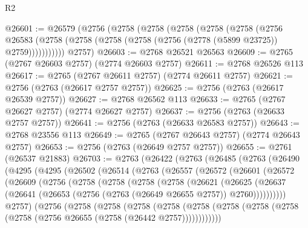\begin{lexlean}{R2}
\begin{coremodule}
@26601 := @26579
    (@2756
      (@2758
        (@2758
          (@2758
            (@2758
              (@2758
                (@2756
                  @26583
                  (@2758 (@2758 (@2758 (@2758 (@2756 (@2778 (@5899 @23725)) @2759)))))))))))
      @2757)
@26603 := @2768 @26521 @26563
@26609 := @2765 (@2767 @26603 @2757) (@2774 @26603 @2757)
@26611 := @2768 @26526 @113
@26617 := @2765 (@2767 @26611 @2757) (@2774 @26611 @2757)
@26621 := @2756 (@2763 (@26617 @2757 @2757))
@26625 := @2756 (@2763 (@26617 @26539 @2757))
@26627 := @2768 @26562 @113
@26633 := @2765 (@2767 @26627 @2757) (@2774 @26627 @2757)
@26637 := @2756 (@2763 (@26633 @2757 @2757))
@26641 := @2756 (@2763 (@26633 @26583 @2757))
@26643 := @2768 @23556 @113
@26649 := @2765 (@2767 @26643 @2757) (@2774 @26643 @2757)
@26653 := @2756 (@2763 (@26649 @2757 @2757))
@26655 := @2761 (@26537 @21883)
@26703 := @2763
    (@26422
      (@2763
        (@26485
          (@2763
            (@26490
              (@4295
                (@4295
                  (@26502
                    (@26514
                      (@2763
                        (@26557
                          (@26572
                            (@26601
                              (@26572
                                (@26609
                                  (@2756
                                    (@2758
                                      (@2758
                                        (@2758
                                          (@2758
                                            (@26621
                                              (@26625
                                                (@26637
                                                  (@26641
                                                    (@26653
                                                      (@2756
                                                        (@2763 (@26649 @26655 @2757))
                                                        @2760))))))))))
                                    @2757)
                                  (@2756
                                    (@2758
                                      (@2758
                                        (@2758
                                          (@2758
                                            (@2758
                                              (@2758
                                                (@2758
                                                  (@2758
                                                    (@2758
                                                      (@2756 @26655 (@2758 (@26442 @2757))))))))))))

\end{coremodule}
\end{lexlean}
